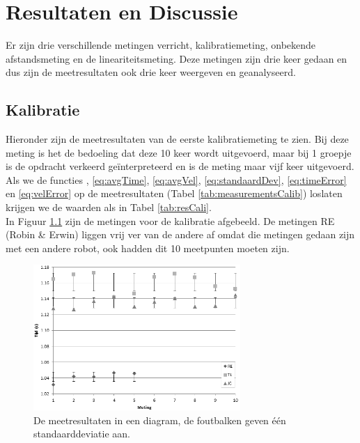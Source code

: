 \documentclass{report}
\begin{document}
\chapter{Resultaten en Discussie}
Er zijn drie verschillende metingen verricht, kalibratiemeting, onbekende afstandsmeting en de lineariteitsmeting. Deze metingen zijn drie keer gedaan en dus zijn de meetresultaten ook drie keer weergeven en geanalyseerd.
\section{Kalibratie}
Hieronder zijn de meetresultaten van de eerste kalibratiemeting te zien. Bij deze meting is het de bedoeling dat deze 10 keer wordt uitgevoerd, maar bij 1 groepje is de opdracht verkeerd ge\"interpreteerd en is de meting maar vijf keer uitgevoerd.\\

Als we de functies \label{eq:vel}, \ref{eq:avgTime},  \ref{eq:avgVel},  \ref{eq:standaardDev},  \ref{eq:timeError} en  \ref{eq:velError} op de meetresultaten (Tabel \ref{tab:measurementsCalib}) loslaten krijgen we de waarden als in Tabel \ref{tab:resCali}.\\

In Figuur \ref{fig:measureGraph} zijn de metingen voor de kalibratie afgebeeld. De metingen RE (Robin \& Erwin) liggen vrij ver van de andere af omdat die metingen gedaan zijn met een andere robot, ook hadden dit 10 meetpunten moeten zijn.

\begin{figure}[H]
	\centering
	\includegraphics[width=0.7\textwidth]{kalibratie}
	\caption{De meetresultaten in een diagram, de foutbalken geven één standaarddeviatie aan.}
	\label{fig:measureGraph}
\end{figure}
\end{document}
